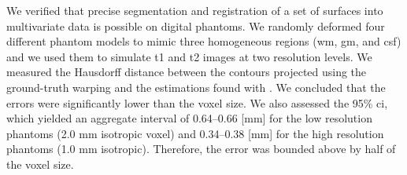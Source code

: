 We verified that precise segmentation and registration of a set of surfaces into multivariate
  data is possible on digital phantoms.
We randomly deformed four different phantom models to mimic three homogeneous regions
  (\gls*{wm}, \gls*{gm}, and \acrlong*{csf}) and we used them to simulate \gls*{t1}
  and \gls*{t2} images at two resolution levels.
We measured the Hausdorff distance between the contours projected using the
  ground-truth warping and the estimations found with \regseg{}.
We concluded that the errors were significantly lower than the voxel size.
We also assessed the 95\% \gls*{ci}, which yielded an aggregate interval of
  0.64--0.66 [mm] for the low resolution phantoms (2.0 mm isotropic voxel) and
  0.34--0.38 [mm] for the high resolution phantoms (1.0 mm isotropic).
Therefore, the error was bounded above by half of the voxel size.
\revcomment[C8 (R.1)]{%
The distributions of errors along surfaces varied importantly depending on the shape of the
  phantom (see \autoref{fig:regseg-phantom}B).
The misregistration error of the ``gyrus'' phantom showed a much lower spread than that
  for the other shapes.
We argue that the symmetry of those other shapes posed difficulties in driving the contours
  towards the appropriate region due to \emph{sliding} displacements between the
  surfaces and their ground-truth position.
The effect is not detectable by the active contours framework, but it is controllable
  increasing the regularization constraints.
When \regseg{} is applied on real datasets, this surface sliding is negligible for the
  convoluted nature of cortical surfaces and the directional restriction of the
  distortion.}

